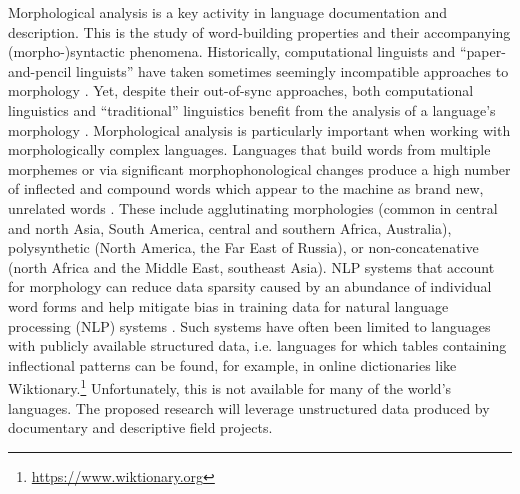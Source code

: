 Morphological analysis is a key activity in language documentation and description. This is the study of word-building properties and their accompanying (morpho-)syntactic phenomena. Historically, computational linguists and ``paper-and-pencil linguists'' have taken sometimes seemingly incompatible approaches to morphology \citep{sproat_1992,karttunen_2005}. Yet, despite their out-of-sync approaches, both computational linguistics and ``traditional'' linguistics benefit from the analysis of a language's morphology \citep{cotterell_labeled_2015}. Morphological analysis is particularly important when working with morphologically complex languages.  Languages that build words from multiple morphemes or via significant morphophonological changes produce a high number of inflected and compound words which appear to the machine as brand new, unrelated words \citep{dreyer_discovering_2011,goldsmith_computational_2017,hammarstrom_unsupervised_2011,kann_neural_2016,ruokolainen_supervised_2013}. These include agglutinating morphologies (common in central and north Asia, South America, central and southern Africa, Australia), polysynthetic (North America, the Far East of Russia), or non-concatenative (north Africa and the Middle East, southeast Asia). NLP systems that account for morphology can reduce data sparsity caused by an abundance of individual word forms \citep{mccarthy-etal-2019-sigmorphon,vylomova2020sigmorphon} and help mitigate bias in training data for natural language processing (NLP) systems \citep{zmigrod-etal-2019-counterfactual}. Such systems have often been limited to languages with publicly available structured data, i.e. languages for which tables containing inflectional patterns can be found, for example, in online dictionaries like Wiktionary.\footnote{\url{https://www.wiktionary.org}} Unfortunately, this is not available for many of the world's languages. The proposed research will leverage unstructured data produced by documentary and descriptive field projects.
%

